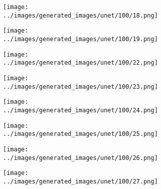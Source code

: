 \begin{figure}[H]
\begin{subfigure}[b]{0.1\textwidth}
 \centering
 \texttt{[image: ../images/generated\_images/unet/100/18.png]}
\end{subfigure}
\hspace{1em}%
\begin{subfigure}[b]{0.1\textwidth}
 \centering
 \texttt{[image: ../images/generated\_images/unet/100/19.png]}
\end{subfigure}
\hspace{1em}%
\begin{subfigure}[b]{0.1\textwidth}
 \centering
 \texttt{[image: ../images/generated\_images/unet/100/22.png]}
\end{subfigure}
\hspace{1em}%
\begin{subfigure}[b]{0.1\textwidth}
 \centering
 \texttt{[image: ../images/generated\_images/unet/100/23.png]}
\end{subfigure}
\hspace{1em}%
\begin{subfigure}[b]{0.1\textwidth}
 \centering
 \texttt{[image: ../images/generated\_images/unet/100/24.png]}
\end{subfigure}
\hspace{1em}%
\begin{subfigure}[b]{0.1\textwidth}
\centering
\texttt{[image: ../images/generated\_images/unet/100/25.png]}
\end{subfigure}
\hspace{1em}%
\begin{subfigure}[b]{0.1\textwidth}
 \centering
 \texttt{[image: ../images/generated\_images/unet/100/26.png]}
\end{subfigure}
\hspace{1em}%
\begin{subfigure}[b]{0.1\textwidth}
 \centering
 \texttt{[image: ../images/generated\_images/unet/100/27.png]}
\end{subfigure}
\hspace{1em}%
\begin{subfigure}[b]{0.1\textwidth}
 \centering

\end{subfigure}
\end{figure}
